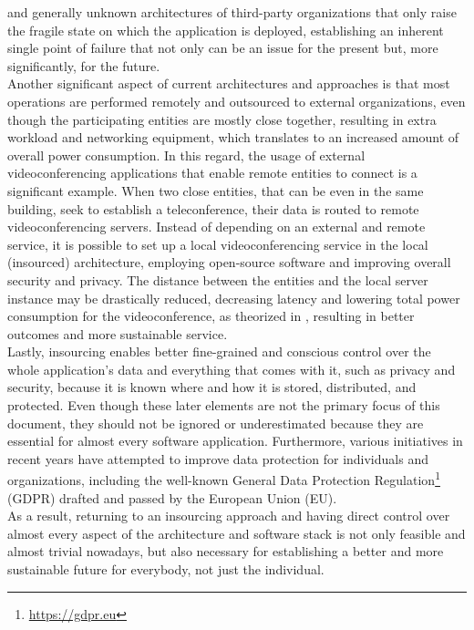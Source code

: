 and generally unknown architectures of third-party organizations that only raise
the fragile state on which the application is deployed, establishing an inherent
single point of failure that not only can be an issue for the present but, more significantly,
for the future. \\ %
Another significant aspect of current architectures and approaches is that most
operations are performed remotely and outsourced to external organizations, even
though the participating entities are mostly close together, resulting in extra
workload and networking equipment, which translates to an increased amount of overall
power consumption. In this regard, the usage of external videoconferencing applications
that enable remote entities to connect is a significant example. When two close
entities, that can be even in the same building, seek to establish a
teleconference, their data is routed to remote videoconferencing servers.
Instead of depending on an external and remote service, it is possible to set up
a local videoconferencing service in the local (insourced) architecture,
employing open-source software and improving overall security and privacy. The distance
between the entities and the local server instance may be drastically reduced,
decreasing latency and lowering total power consumption for the videoconference,
as theorized in \cite{comparison_energy_carbon_time_videoconferencing},
resulting in better outcomes and more sustainable service. \\ %
Lastly, insourcing enables better fine-grained and conscious control over the whole
application's data and everything that comes with it, such as privacy and
security, because it is known where and how it is stored, distributed, and protected.
Even though these later elements are not the primary focus of this document, they
should not be ignored or underestimated because they are essential for almost every
software application. Furthermore, various initiatives in recent years have attempted
to improve data protection for individuals and organizations, including the well-known
General Data Protection Regulation\footnote{\url{https://gdpr.eu}} (GDPR)
drafted and passed by the European Union (EU). \\ %
As a result, returning to an insourcing approach and having direct control over almost
every aspect of the architecture and software stack is not only feasible and almost
trivial nowadays, but also necessary for establishing a better and more
sustainable future for everybody, not just the individual. \\ %

